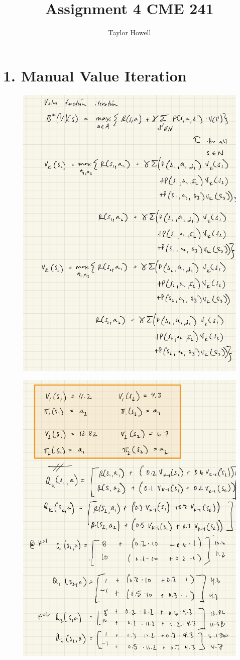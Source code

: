 \documentclass[12pt]{article}
\title{Assignment 4 CME 241}
\author{Taylor Howell}
\begin{document}
\maketitle

\newpage
\section*{1. Manual Value Iteration}
\begin{figure}[!htb]
	\centering
	\includegraphics[width=.75\textwidth]{ipad/q1_1.jpg}
\end{figure}

\begin{figure}[!htb]
	\centering
	\includegraphics[width=.75\textwidth]{ipad/q1_2.jpg}
\end{figure}
\end{document}
